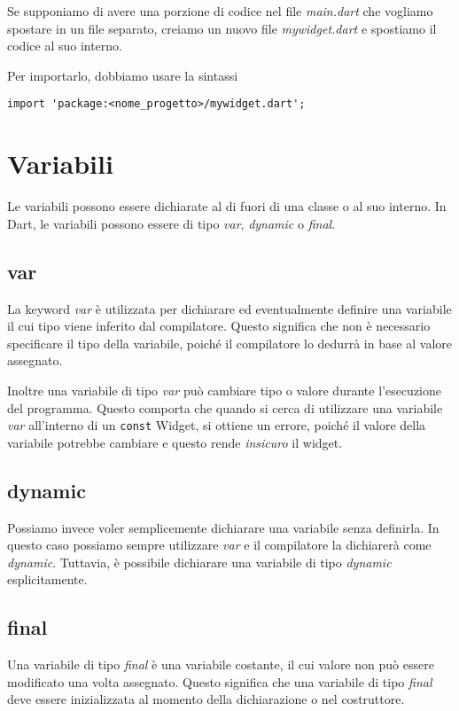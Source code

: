\documentclass[12pt]{article}
\begin{document}
Se supponiamo di avere una porzione di codice nel file
\textit{main.dart} che vogliamo spostare in un file separato,
creiamo un nuovo file \textit{mywidget.dart} e spostiamo il codice
al suo interno.

Per importarlo, dobbiamo usare la sintassi
\begin{highlight}
\begin{verbatim}
import 'package:<nome_progetto>/mywidget.dart';
\end{verbatim}
\end{highlight}


\section{Variabili}
Le variabili possono essere dichiarate al di fuori di una classe o al 
suo interno.
In Dart, le variabili possono essere di tipo \textit{var}, \textit{dynamic} o \textit{final}.

\subsection{var}
La keyword \textit{var} è utilizzata per dichiarare ed 
eventualmente definire una variabile il cui tipo
viene inferito dal compilatore. Questo significa che non è necessario specificare
il tipo della variabile, poiché il compilatore lo dedurrà in base al valore assegnato.

Inoltre una variabile di tipo \textit{var} può cambiare tipo o valore 
durante l'esecuzione del programma. 
Questo comporta che quando si cerca di utilizzare una variabile 
\textit{var} all'interno di un \texttt{const} Widget, si ottiene 
un errore, poiché il valore della variabile potrebbe cambiare e 
questo rende \textit{insicuro} il widget.

\subsection{dynamic}
Possiamo invece voler semplicemente dichiarare una variabile 
senza definirla. In questo caso possiamo sempre utilizzare \textit{var}
e il compilatore la dichiarerà come \textit{dynamic}.
Tuttavia, è possibile dichiarare una variabile di tipo \textit{dynamic}
esplicitamente.

\subsection{final}
Una variabile di tipo \textit{final} è una variabile costante,
il cui valore non può essere modificato una volta assegnato.
Questo significa che una variabile di tipo \textit{final} deve essere
inizializzata al momento della dichiarazione o nel costruttore.
\end{document}

